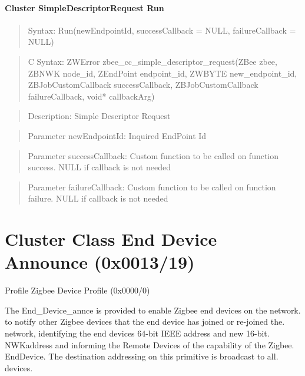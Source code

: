 \paragraph{Cluster SimpleDescriptorRequest Run}
\begin{quote}Syntax: Run(newEndpointId, successCallback = NULL, failureCallback = NULL)\end{quote}
\begin{quote}C Syntax: ZWError zbee\_cc\_simple\_descriptor\_request(ZBee zbee, ZBNWK node\_id, ZEndPoint endpoint\_id, ZWBYTE new\_endpoint\_id, ZBJobCustomCallback successCallback, ZBJobCustomCallback failureCallback, void* callbackArg)\end{quote}
\begin{quote}Description: Simple Descriptor Request\end{quote}
\begin{quote}Parameter newEndpointId: Inquired EndPoint Id\end{quote}
\begin{quote}Parameter successCallback: Custom function to be called on function success. NULL if callback is not needed\end{quote}
\begin{quote}Parameter failureCallback: Custom function to be called on function failure. NULL if callback is not needed\end{quote}



\section{Cluster Class End Device Announce (0x0013/19)}

Profile Zigbee Device Profile (0x0000/0)

The End\_Device\_annce is provided to enable Zigbee end devices on the network. to notify other Zigbee devices that the end device has joined or re-joined the. network, identifying the end devices 64-bit IEEE address and new 16-bit. NWKaddress and informing the Remote Devices of the capability of the Zigbee. EndDevice. The destination addressing on this primitive is broadcast to all. devices.
